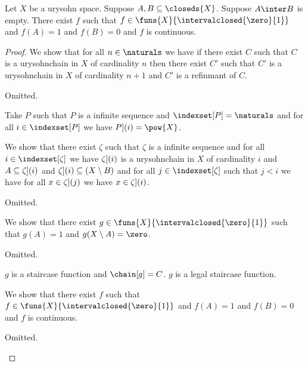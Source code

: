 
\begin{theorem}\label{urysohn}
    Let $X$ be a urysohn space.
    Suppose $A,B \subseteq \closeds{X}$.
    Suppose $A \inter B$ is empty.
    There exist $f$ such that $f \in \funs{X}{\intervalclosed{\zero}{1}}$ 
    and $f(A) = 1$ and $f(B)= 0$ and $f$ is continuous.
\end{theorem}
\begin{proof}
    We show that for all $n \in \naturals$ we have
    if there exist $C$ such that $C$ is a urysohnchain in $X$ of cardinality $n$ 
    then there exist $C'$  such that $C'$ is a urysohnchain in $X$ of cardinality $n+1$ 
    and $C'$ is a refinmant of $C$.
    \begin{subproof}
        Omitted.
    \end{subproof}

    

    Take $P$ such that $P$ is a infinite sequence and $\indexset[P] = \naturals$ and for all $i \in \indexset[P]$ we have $\index[P](i) = \pow{X}$.
    
    We show that there exist $\zeta$ such that $\zeta$ is a infinite sequence 
    and for all $i \in \indexset[\zeta]$ we have 
    $\index[\zeta](i)$ is a urysohnchain in $X$ of cardinality $i$
    and $A \subseteq \index[\zeta](i)$
    and $\index[\zeta](i) \subseteq (X \setminus B)$
    and for all $j \in \indexset[\zeta]$ such that 
    $j < i$ we have for all $x \in \index[\zeta](j)$ we have $x \in \index[\zeta](i)$.
    \begin{subproof}
        Omitted.
    \end{subproof}
  
    


    



    We show that there exist $g \in \funs{X}{\intervalclosed{\zero}{1}}$ such that $g(A)=1$ and $g(X\setminus A) = \zero$.
    \begin{subproof}
        Omitted.
    \end{subproof}
    $g$ is a staircase function and $\chain[g] = C$.
    $g$ is a legal staircase function.


    We show that there exist $f$ such that $f \in \funs{X}{\intervalclosed{\zero}{1}}$ 
    and $f(A) = 1$ and $f(B)= 0$ and $f$ is continuous.
    \begin{subproof}
        Omitted.
    \end{subproof}



\end{proof}
